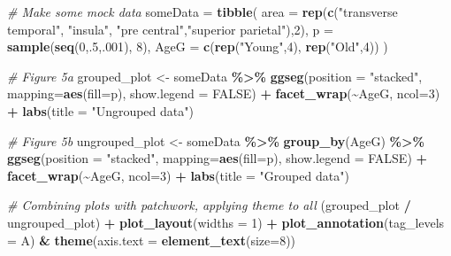 \documentclass[fleqn,10pt]{wlpeerj} %
\newenvironment{Shaded}{\begin{snugshade}}{\end{snugshade}}
\newcommand{\CommentTok}[1]{\textcolor[rgb]{0.56,0.35,0.01}{\textit{#1}}}
\newcommand{\DataTypeTok}[1]{\textcolor[rgb]{0.13,0.29,0.53}{#1}}
\newcommand{\DecValTok}[1]{\textcolor[rgb]{0.00,0.00,0.81}{#1}}
\newcommand{\KeywordTok}[1]{\textcolor[rgb]{0.13,0.29,0.53}{\textbf{#1}}}
\newcommand{\NormalTok}[1]{#1}
\newcommand{\OperatorTok}[1]{\textcolor[rgb]{0.81,0.36,0.00}{\textbf{#1}}}
\newcommand{\OtherTok}[1]{\textcolor[rgb]{0.56,0.35,0.01}{#1}}
\newcommand{\StringTok}[1]{\textcolor[rgb]{0.31,0.60,0.02}{#1}}
\begin{document}
\begin{Shaded}
\begin{Highlighting}[]
\CommentTok{\# Make some mock data}
\NormalTok{someData =}\StringTok{ }\KeywordTok{tibble}\NormalTok{(}
  \DataTypeTok{area =} \KeywordTok{rep}\NormalTok{(}\KeywordTok{c}\NormalTok{(}\StringTok{"transverse temporal"}\NormalTok{, }\StringTok{"insula"}\NormalTok{,}
               \StringTok{"pre central"}\NormalTok{,}\StringTok{"superior parietal"}\NormalTok{),}\DecValTok{2}\NormalTok{),}
  \DataTypeTok{p =} \KeywordTok{sample}\NormalTok{(}\KeywordTok{seq}\NormalTok{(}\DecValTok{0}\NormalTok{,.}\DecValTok{5}\NormalTok{,.}\DecValTok{001}\NormalTok{), }\DecValTok{8}\NormalTok{),}
  \DataTypeTok{AgeG =} \KeywordTok{c}\NormalTok{(}\KeywordTok{rep}\NormalTok{(}\StringTok{"Young"}\NormalTok{,}\DecValTok{4}\NormalTok{), }\KeywordTok{rep}\NormalTok{(}\StringTok{"Old"}\NormalTok{,}\DecValTok{4}\NormalTok{))}
\NormalTok{)}

\CommentTok{\# Figure 5a}
\NormalTok{grouped\_plot <{-}}\StringTok{ }\NormalTok{someData }\OperatorTok{\%>\%}
\StringTok{  }\KeywordTok{ggseg}\NormalTok{(}\DataTypeTok{position =} \StringTok{"stacked"}\NormalTok{,}
      \DataTypeTok{mapping=}\KeywordTok{aes}\NormalTok{(}\DataTypeTok{fill=}\NormalTok{p), }\DataTypeTok{show.legend =} \OtherTok{FALSE}\NormalTok{) }\OperatorTok{+}
\StringTok{  }\KeywordTok{facet\_wrap}\NormalTok{(}\OperatorTok{\textasciitilde{}}\NormalTok{AgeG, }\DataTypeTok{ncol=}\DecValTok{3}\NormalTok{) }\OperatorTok{+}
\StringTok{  }\KeywordTok{labs}\NormalTok{(}\DataTypeTok{title =} \StringTok{"Ungrouped data"}\NormalTok{)}

\CommentTok{\# Figure 5b}
\NormalTok{ungrouped\_plot <{-}}\StringTok{ }\NormalTok{someData }\OperatorTok{\%>\%}
\StringTok{  }\KeywordTok{group\_by}\NormalTok{(AgeG) }\OperatorTok{\%>\%}
\StringTok{  }\KeywordTok{ggseg}\NormalTok{(}\DataTypeTok{position =} \StringTok{"stacked"}\NormalTok{,}
      \DataTypeTok{mapping=}\KeywordTok{aes}\NormalTok{(}\DataTypeTok{fill=}\NormalTok{p), }\DataTypeTok{show.legend =} \OtherTok{FALSE}\NormalTok{) }\OperatorTok{+}
\StringTok{  }\KeywordTok{facet\_wrap}\NormalTok{(}\OperatorTok{\textasciitilde{}}\NormalTok{AgeG, }\DataTypeTok{ncol=}\DecValTok{3}\NormalTok{) }\OperatorTok{+}
\StringTok{  }\KeywordTok{labs}\NormalTok{(}\DataTypeTok{title =} \StringTok{"Grouped data"}\NormalTok{)}

\CommentTok{\# Combining plots with patchwork, applying theme to all}
\NormalTok{(grouped\_plot }\OperatorTok{/}\StringTok{ }\NormalTok{ungrouped\_plot) }\OperatorTok{+}
\StringTok{  }\KeywordTok{plot\_layout}\NormalTok{(}\DataTypeTok{widths =} \DecValTok{1}\NormalTok{) }\OperatorTok{+}\StringTok{ }
\StringTok{  }\KeywordTok{plot\_annotation}\NormalTok{(}\DataTypeTok{tag\_levels =} \StringTok{\textquotesingle{}A\textquotesingle{}}\NormalTok{) }\OperatorTok{\&}
\StringTok{  }\KeywordTok{theme}\NormalTok{(}\DataTypeTok{axis.text =} \KeywordTok{element\_text}\NormalTok{(}\DataTypeTok{size=}\DecValTok{8}\NormalTok{))}
\end{Highlighting}
\end{Shaded}
\end{document}
